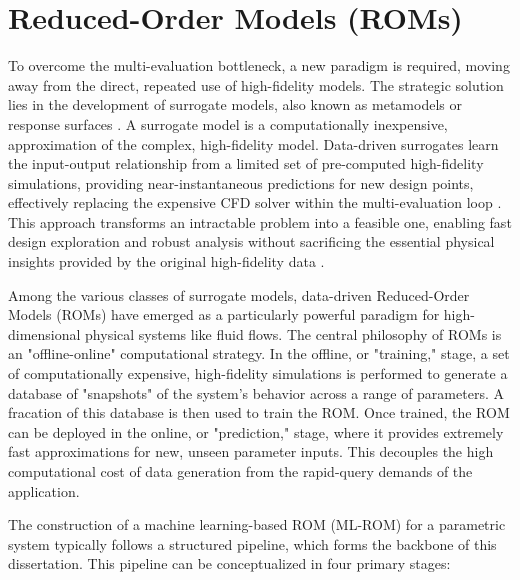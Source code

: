\documentclass[dsc, EN]{ufabcFHZh}
\begin{document}
\section{Reduced-Order Models (ROMs)}

To overcome the multi-evaluation bottleneck, a new paradigm is required, moving away from the direct, repeated use of high-fidelity models. The strategic solution lies in the development of surrogate models, also known as metamodels or response surfaces \citep{Hu2020}. A surrogate model is a computationally inexpensive, approximation of the complex, high-fidelity model. Data-driven surrogates learn the input-output relationship from a limited set of pre-computed high-fidelity simulations, providing near-instantaneous predictions for new design points, effectively replacing the expensive CFD solver within the multi-evaluation loop \citep{Yondo2018, EspinosaBarcenas2023}. This approach transforms an intractable problem into a feasible one, enabling fast design exploration and robust analysis without sacrificing the essential physical insights provided by the original high-fidelity data \citep{Hu2020}.

Among the various classes of surrogate models, data-driven Reduced-Order Models (ROMs) have emerged as a particularly powerful paradigm for high-dimensional physical systems like fluid flows. The central philosophy of ROMs is an "offline-online" computational strategy. In the offline, or "training," stage, a set of computationally expensive, high-fidelity simulations is performed to generate a database of "snapshots" of the system's behavior across a range of parameters. A fracation of this database is then used to train the ROM. Once trained, the ROM can be deployed in the online, or "prediction," stage, where it provides extremely fast approximations for new, unseen parameter inputs. This decouples the high computational cost of data generation from the rapid-query demands of the application.

The construction of a machine learning-based ROM (ML-ROM) for a parametric system typically follows a structured pipeline, which forms the backbone of this dissertation. This pipeline can be conceptualized in four primary stages:
\end{document}
